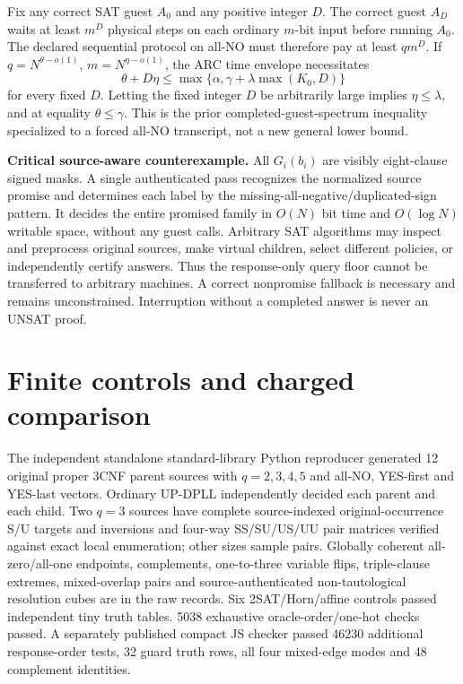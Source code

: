\documentclass[11pt]{article}
\begin{document}
Fix any correct SAT guest $A_0$ and any positive integer $D$. The correct guest $A_D$ waits at least $m^D$ physical steps on each ordinary $m$-bit input before running $A_0$. The declared sequential protocol on all-NO must therefore pay at least $qm^D$. If $q=N^{\theta-o(1)}$, $m=N^{\eta-o(1)}$, the ARC time envelope necessitates
\[
\theta+D\eta\le\max\{\alpha,\gamma+\lambda\max(K_0,D)\}
\]
for every fixed $D$. Letting the fixed integer $D$ be arbitrarily large implies $\eta\le\lambda$, and at equality $\theta\le\gamma$. This is the prior completed-guest-spectrum inequality specialized to a forced all-NO transcript, not a new general lower bound.

\noindent\textbf{Critical source-aware counterexample.} All $G_i(b_i)$ are visibly eight-clause signed masks. A single authenticated pass recognizes the normalized source promise and determines each label by the missing-all-negative/duplicated-sign pattern. It decides the entire promised family in $O(N)$ bit time and $O(\log N)$ writable space, without any guest calls. Arbitrary SAT algorithms may inspect and preprocess original sources, make virtual children, select different policies, or independently certify answers. Thus the response-only query floor cannot be transferred to arbitrary machines. A correct nonpromise fallback is necessary and remains unconstrained. Interruption without a completed answer is never an UNSAT proof.

\section{Finite controls and charged comparison}
The independent standalone standard-library Python reproducer generated 12 original proper 3CNF parent sources with $q=2,3,4,5$ and all-NO, YES-first and YES-last vectors. Ordinary UP-DPLL independently decided each parent and each child. Two $q=3$ sources have complete source-indexed original-occurrence S/U targets and inversions and four-way SS/SU/US/UU pair matrices verified against exact local enumeration; other sizes sample pairs. Globally coherent all-zero/all-one endpoints, complements, one-to-three variable flips, triple-clause extremes, mixed-overlap pairs and source-authenticated non-tautological resolution cubes are in the raw records. Six 2SAT/Horn/affine controls passed independent tiny truth tables. 5038 exhaustive oracle-order/one-hot checks passed. A separately published compact JS checker passed 46230 additional response-order tests, 32 guard truth rows, all four mixed-edge modes and 48 complement identities.
\end{document}
